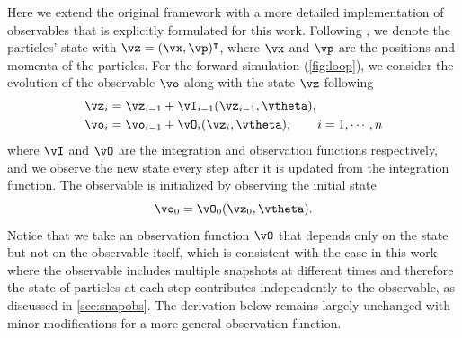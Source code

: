 \documentclass[modern, trackchanges, dvipsnames]{aastex631}
\begin{document}
Here we extend the original framework with a more detailed
implementation of observables that is explicitly formulated for this
work.
Following \citet{Li2022a}, we denote the particles' state with $\vz =
(\vx, \vp)^\intercal$, where $\vx$ and $\vp$ are the positions and
momenta of the particles.
For the forward simulation (\autoref{fig:loop}), we consider the
evolution of the observable $\vo$ along with the state $\vz$ following
\begin{align}
\vz_i &= \vz_{i-1} + \vI_{i-1}(\vz_{i-1}, \vtheta), \\
\vo_i &= \vo_{i-1} + \vO_i(\vz_i, \vtheta), \qquad i=1,\cdots,n
\label{IO_fwd}
\end{align}
where $\vI$ and $\vO$ are the integration and observation functions
respectively, and we observe the new state every step after it is
updated from the integration function.
The observable is initialized by observing the initial state
\begin{equation}
\vo_0 = \vO_0(\vz_0, \vtheta).
\label{O_init}
\end{equation}
Notice that we take an observation function $\vO$ that depends only on
the state but not on the observable itself, which is consistent with the
case in this work where the observable includes multiple snapshots at
different times and therefore the state of particles at each step
contributes independently to the observable, as discussed in
\autoref{sec:snapobs}.
The derivation below remains largely unchanged with minor modifications for
a more general observation function.
\end{document}
